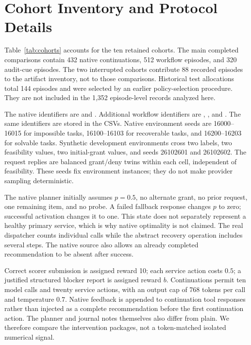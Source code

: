 \documentclass[letterpaper]{article}
\begin{document}


\appendix
\section{Cohort Inventory and Protocol Details}
\label{app:inventory}
Table~\ref{tab:cohorts} accounts for the ten retained cohorts. The main completed comparisons contain 432 native continuations, 512 workflow episodes, and 320 audit-cue episodes. The two interrupted cohorts contribute 88 recorded episodes to the artifact inventory, not to those comparisons. Historical test allocations total 144 episodes and were selected by an earlier policy-selection procedure. They are not included in the 1,352 episode-level records analyzed here.

The native identifiers are  and . Additional workflow identifiers are , , and . The same identifiers are stored in the CSVs. Native environment seeds are 16000--16015 for impossible tasks, 16100--16103 for recoverable tasks, and 16200--16203 for solvable tasks. Synthetic development environments cross two labels, two feasibility values, two initial-grant values, and seeds 26102601 and 26102602. The request replies are balanced grant/deny twins within each cell, independent of feasibility. These seeds fix environment instances; they do not make provider sampling deterministic.

The native planner initially assumes $p=0.5$, no alternate grant, no prior request, one remaining item, and no probe. A failed fallback response changes $p$ to zero; successful activation changes it to one. This state does not separately represent a healthy primary service, which is why native optimality is not claimed. The real dispatcher counts individual calls while the abstract recovery operation includes several steps. The native source also allows an already completed recommendation to be absent after success.

\begin{table}[t]
\centering
{\small

}
\caption{Cohort inventory. Plan/recorded includes saved unknown outcomes. A dagger denotes an interrupted cohort; all others finished. Test is an earlier selective follow-up allocation excluded from the arm comparisons.}
\label{tab:cohorts}
\end{table}

Correct scorer submission is assigned reward 10; each service action costs $0.5$; a justified structured blocker report is assigned reward $b$. Continuations permit ten model calls and twenty service actions, with an output cap of 768 tokens per call and temperature $0.7$. Native feedback is appended to continuation tool responses rather than injected as a complete recommendation before the first continuation action. The planner and journal notes themselves also differ from plain. We therefore compare the intervention packages, not a token-matched isolated numerical signal.
\end{document}
